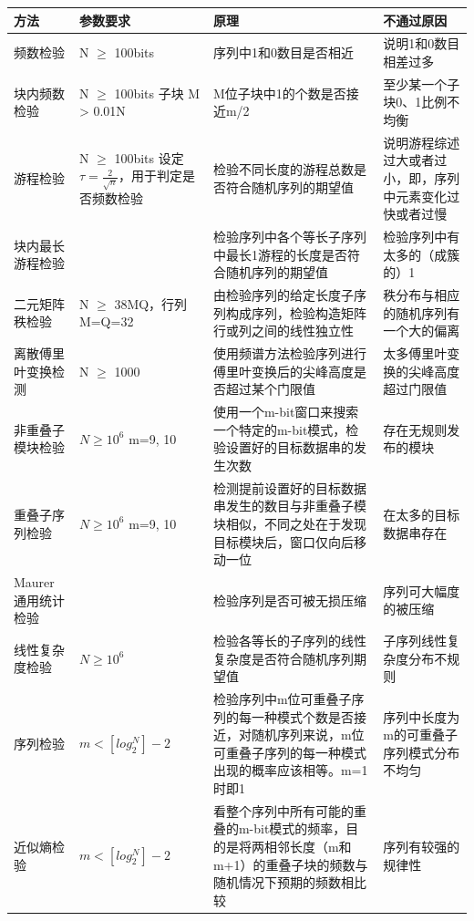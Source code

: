 \documentclass[master]{seuthesis} %
\begin{document}
\begin{Main}

\begin{table}[]
    \centering
    \begin{tabular}{p{70pt}p{70pt}p{200pt}p{100pt}}
    \hline
    方法 & 参数要求 & 原理 & 不通过原因 \\ \hline
    频数检验 & N $\geq$ 100bits & 序列中1和0数目是否相近 & 说明1和0数目相差过多  \\ \hline
    块内频数检验 & N $\geq$ 100bits 子块 M > 0.01N & M位子块中1的个数是否接近m/2 & 至少某一个子块0、1比例不均衡 \\ \hline
    游程检验 & N $\geq$ 100bits 设定$\tau = \frac{2}{\sqrt{n}}$，用于判定是否频数检验 & 检验不同长度的游程总数是否符合随机序列的期望值 & 说明游程综述过大或者过小，即，序列中元素变化过快或者过慢  \\ \hline
    块内最长游程检验 &  & 检验序列中各个等长子序列中最长1游程的长度是否符合随机序列的期望值 & 检验序列中有太多的（成簇的）1 \\ \hline
    二元矩阵秩检验 & N $\geq$ 38MQ，行列M=Q=32 & 由检验序列的给定长度子序列构成序列，检验构造矩阵行或列之间的线性独立性 & 秩分布与相应的随机序列有一个大的偏离 \\ \hline
    离散傅里叶变换检测 & N $\geq$ 1000 & 使用频谱方法检验序列进行傅里叶变换后的尖峰高度是否超过某个门限值 & 太多傅里叶变换的尖峰高度超过门限值 \\ \hline
    非重叠子模块检验 & $ N \geq 10^6$  m={9, 10} & 使用一个m-bit窗口来搜索一个特定的m-bit模式，检验设置好的目标数据串的发生次数 & 存在无规则发布的模块 \\ \hline
    重叠子序列检验 & $N \geq 10^6$ m={9, 10} & 检测提前设置好的目标数据串发生的数目与非重叠子模块相似，不同之处在于发现目标模块后，窗口仅向后移动一位 & 在太多的目标数据串存在 \\ \hline
    Maurer通用统计检验 & & 检验序列是否可被无损压缩 & 序列可大幅度的被压缩 \\ \hline
    线性复杂度检验 & $N \geq 10^6$ & 检验各等长的子序列的线性复杂度是否符合随机序列期望值 & 子序列线性复杂度分布不规则 \\ \hline
    序列检验 & $ m < [log_2^N] - 2$ & 检验序列中m位可重叠子序列的每一种模式个数是否接近，对随机序列来说，m位可重叠子序列的每一种模式出现的概率应该相等。m=1时即1 & 序列中长度为m的可重叠子序列模式分布不均匀 \\ \hline
    近似熵检验 & $ m < [log_2^N] - 2$ & 看整个序列中所有可能的重叠的m-bit模式的频率，目的是将两相邻长度（m和m+1）的重叠子块的频数与随机情况下预期的频数相比较 & 序列有较强的规律性 \\ \hline

\end{tabular}
\end{table}
\end{Main}
\end{document}

